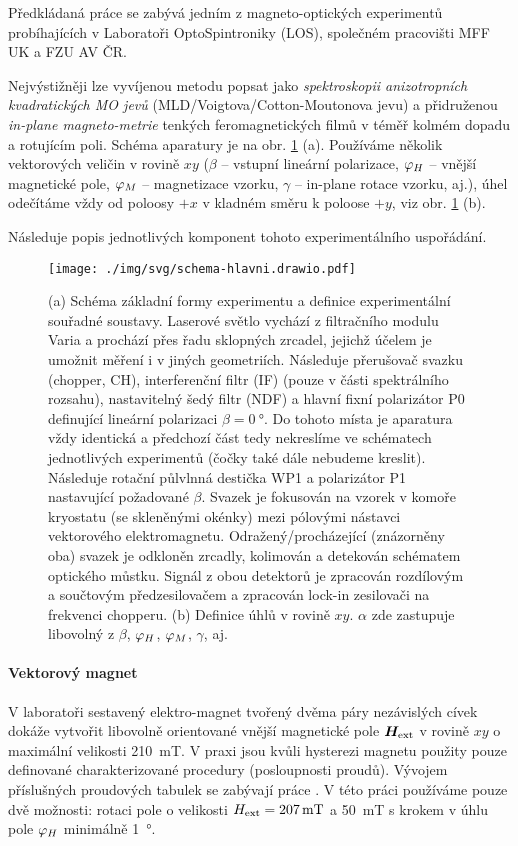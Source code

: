 Předkládaná práce se zabývá jedním z magneto-optických experimentů probíhajících v Laboratoři OptoSpintroniky (LOS), společném pra\-co\-viš\-ti \linebreak MFF UK a FZU AV ČR.

Nejvýstižněji lze vyvíjenou metodu popsat jako \emph{spektroskopii anizotropních kvadratických MO jevů} (MLD/Voigtova/Cotton-Moutonova jevu) a přidruženou \emph{in-plane magneto-metrie} tenkých feromagnetických filmů v téměř kolmém dopadu a rotujícím poli.
Schéma aparatury je na obr. \ref{fig:zakladni-schema} (a).
Používáme několik vektorových veličin v rovině $xy$ ($\beta$ -- vstupní lineární polarizace, $\varphi_H$ -- vnější magnetické pole, $\varphi_M$ -- magnetizace vzorku, $\gamma$ -- in-plane rotace vzorku, aj.), úhel odečítáme vždy od poloosy $+x$ v kladném směru k poloose $+y$, viz obr. \ref{fig:zakladni-schema} (b).

Následuje popis jednotlivých komponent tohoto experimentálního uspořádání.

\begin{figure}[htbp]
    \centering
    \texttt{[image: ./img/svg/schema-hlavni.drawio.pdf]}
    \caption{(a) Schéma základní formy experimentu a definice experimentální souřadné soustavy.
    Laserové světlo vychází z filtračního modulu Varia a prochází přes řadu sklopných zrcadel, jejichž účelem je umožnit měření i v jiných geometriích.
Následuje přerušovač svazku (chopper, CH), interferenční filtr (IF) (pouze v části spektrálního rozsahu), nastavitelný šedý filtr (NDF) a hlavní fixní polarizátor P0 definující lineární polarizaci $\beta=\SI{0}{\degree}$.
Do tohoto místa je aparatura vždy identická a předchozí část tedy nekreslíme ve schématech jednotlivých experimentů (čočky také dále nebudeme kreslit).
Následuje rotační půlvlnná destička WP1 a polarizátor P1 nastavující požadované $\beta$.
Svazek je fokusován na vzorek v komoře kryostatu (se skleněnými okénky) mezi pólovými nástavci vektorového elektromagnetu.
Odražený/procházející (znázorněny oba) svazek je odkloněn zrcadly, kolimován a detekován schématem optického můstku.
Signál z obou detektorů je zpracován rozdílovým a součtovým předzesilovačem a zpracován lock-in zesilovači na frekvenci chopperu.
(b) Definice úhlů v rovině $xy$. $\alpha$ zde zastupuje libovolný z $\beta$, $\varphi_H$, $\varphi_M$, $\gamma$, aj.}
    \label{fig:zakladni-schema}
\end{figure}

\paragraph{Vektorový magnet}
V laboratoři sestavený elektro-magnet tvořený dvěma páry nezávislých cívek dokáže vytvořit libovolně orientované vnější magnetické pole $\bm{H}_\textrm{ext}$ v rovině $xy$ o maximální velikosti \SI{210}{\milli\tesla}.
V praxi jsou kvůli hysterezi magnetu použity pouze definované charakterizované procedury (posloupnosti proudů).
Vývojem příslušných proudových tabulek se zabývají práce \cite{kimakCharakterizaciaDvojdimenzionalnehoElektromagnetu2017,kimakOptickaSpektroskopieAntiferomagnetu2019}.
V této práci používáme pouze dvě možnosti: rotaci pole o velikosti $H_\textrm{ext}=\SI{207}{\milli\tesla}$ a \SI{50}{\milli\tesla} s krokem v úhlu pole $\varphi_H$ minimálně \SI{1}{\degree}.

